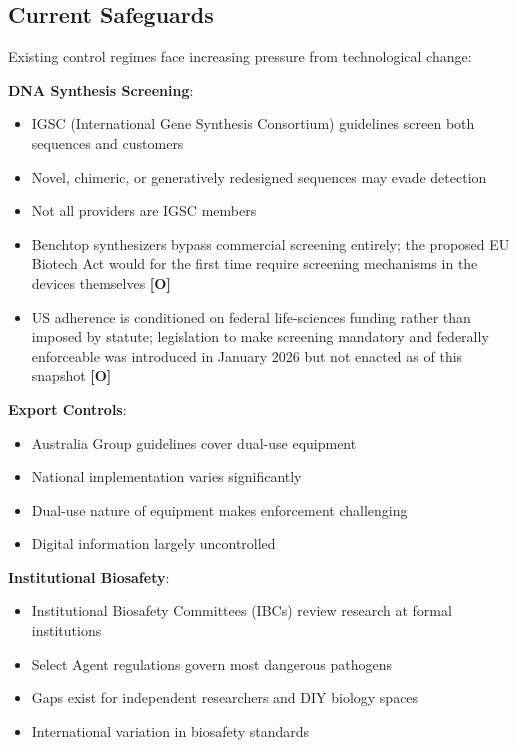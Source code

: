 \documentclass[11pt,letterpaper]{article}
\begin{document}
\subsection{Current Safeguards}

Existing control regimes face increasing pressure from technological change:

\textbf{DNA Synthesis Screening}:
\begin{itemize}[nosep]
  \item IGSC (International Gene Synthesis Consortium) guidelines screen both sequences and customers
  \item Novel, chimeric, or generatively redesigned sequences may evade detection
  \item Not all providers are IGSC members
  \item Benchtop synthesizers bypass commercial screening entirely; the proposed EU Biotech Act would for the first time require screening mechanisms in the devices themselves \textbf{[O]}
  \item US adherence is conditioned on federal life-sciences funding rather than imposed by statute; legislation to make screening mandatory and federally enforceable was introduced in January 2026 but not enacted as of this snapshot \textbf{[O]}
\end{itemize}

\textbf{Export Controls}:
\begin{itemize}[nosep]
  \item Australia Group guidelines cover dual-use equipment
  \item National implementation varies significantly
  \item Dual-use nature of equipment makes enforcement challenging
  \item Digital information largely uncontrolled
\end{itemize}

\textbf{Institutional Biosafety}:
\begin{itemize}[nosep]
  \item Institutional Biosafety Committees (IBCs) review research at formal institutions
  \item Select Agent regulations govern most dangerous pathogens
  \item Gaps exist for independent researchers and DIY biology spaces
  \item International variation in biosafety standards
\end{itemize}
\end{document}
